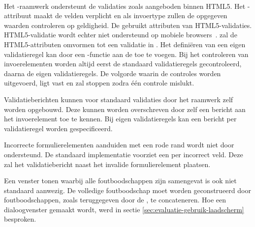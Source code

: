 \paragraph{\kendo}
Het \kendo{}-raamwerk ondersteunt de validaties zoals aangeboden binnen HTML5.
Het -attribuut maakt de velden verplicht  en  als invoertype zullen de opgegeven waarden controleren op geldigheid.
De \kendo{}  gebruikt attributen van HTML5-validaties.
HTML5-validatie wordt echter niet ondersteund op mobiele browsers~\cite{Deveria2013c}. 
\kendo{} zal de HTML5-attributen omvormen tot een validatie in \js{}. 
Het definiëren van een eigen validatieregel kan door een \js-functie aan de  toe te voegen.
Bij het controleren van invoerelementen worden altijd eerst de standaard validatieregels gecontroleerd,  daarna de eigen validatieregels.
De volgorde waarin de controles worden uitgevoerd, ligt vast en zal stoppen zodra één controle mislukt.

Validatieberichten kunnen voor standaard validaties door het raamwerk zelf worden opgebouwd.
Deze kunnen worden overschreven door zelf een bericht aan het invoerelement toe te kennen.
Bij eigen validatieregels kan een bericht per validatieregel worden gespecificeerd.

Incorrecte formulierelementen aanduiden met een rode rand wordt niet door \kendo{} ondersteund.
De standaard implementatie voorziet een  per incorrect veld.
Deze zal het validatiebericht naast het invalide formulierelement plaatsen. 

Een venster tonen waarbij alle foutboodschappen zijn samengevat is ook niet standaard aanwezig.
De volledige foutboodschap moet worden geconstrueerd door foutboodschappen,  zoals teruggegeven door de , te concateneren.
Hoe een dialoogvenster gemaakt wordt, werd in sectie \ref{sec:evaluatie-gebruik-laadscherm} besproken.

